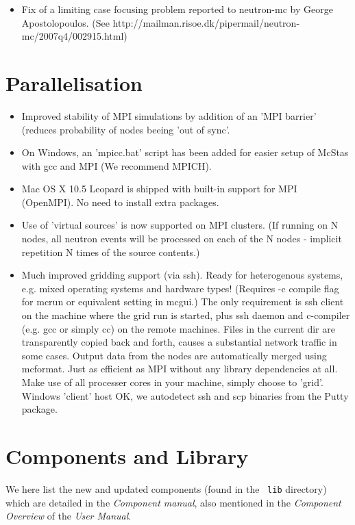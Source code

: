 \begin{itemize}
\item Fix of a limiting case focusing problem reported to neutron-mc by George Apostolopoulos.
      (See http://mailman.risoe.dk/pipermail/neutron-mc/2007q4/002915.html)
\end{itemize}

\section{Parallelisation}
\label{s:new-features:parallelisation}

\begin{itemize}
\item Improved stability of MPI simulations by addition of an 'MPI barrier' (reduces probability of nodes beeing 'out of sync'.
\item On Windows, an 'mpicc.bat' script has been added for easier setup of McStas with gcc and MPI (We recommend MPICH).
\item Mac OS X 10.5 Leopard is shipped with built-in support for MPI (OpenMPI). No need to install extra packages.
\item Use of 'virtual sources' is now supported on MPI clusters. (If running on N nodes, all neutron events will be processed
     on each of the N nodes - implicit repetition N times of the source contents.)
\item Much improved gridding support (via ssh). Ready for heterogenous systems, e.g. mixed operating systems and hardware
     types! (Requires -c compile flag for mcrun or equivalent setting in mcgui.) The only requirement is ssh client on the machine 
     where the grid run is started, plus ssh daemon and c-compiler (e.g. gcc or simply cc) on the remote machines. Files in the 
     current dir are transparently copied back and forth, causes a substantial network traffic in some cases. Output data from the 
     nodes are automatically merged using mcformat. Just as efficient as MPI without any library dependencies at all. Make use 
     of all processer cores in your machine, simply choose to 'grid'. Windows 'client' host OK, we autodetect ssh and scp binaries
     from the Putty package.
\end{itemize}

\section{Components and Library}
\label{s:new-features:components}
 
We here list the new and updated components (found in the \MCS\ \verb+lib+ directory)
which are detailed in the {\it Component manual}, also mentioned in
the {\it Component Overview} of the {\it User Manual}.
